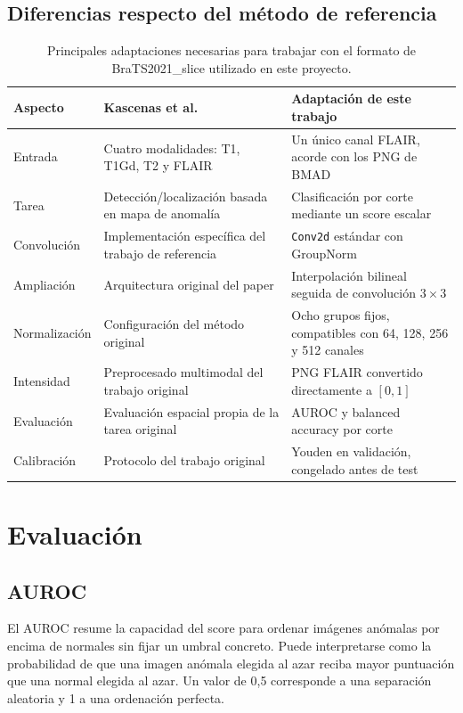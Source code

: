 \documentclass[10pt,a4paper,twocolumn]{article}
\begin{document}
\subsection{Diferencias respecto del método de referencia}
\begin{table}[t]
\centering
\small
\begin{tabularx}{0.98\textwidth}{p{3.0cm}XX}
\toprule
Aspecto & Kascenas et al. & Adaptación de este trabajo \\
\midrule
Entrada & Cuatro modalidades: T1, T1Gd, T2 y FLAIR & Un único canal FLAIR, acorde con los PNG de BMAD \\
Tarea & Detección/localización basada en mapa de anomalía & Clasificación por corte mediante un score escalar \\
Convolución & Implementación específica del trabajo de referencia & \texttt{Conv2d} estándar con GroupNorm \\
Ampliación & Arquitectura original del paper & Interpolación bilineal seguida de convolución $3\times3$ \\
Normalización & Configuración del método original & Ocho grupos fijos, compatibles con 64, 128, 256 y 512 canales \\
Intensidad & Preprocesado multimodal del trabajo original & PNG FLAIR convertido directamente a $[0,1]$ \\
Evaluación & Evaluación espacial propia de la tarea original & AUROC y balanced accuracy por corte \\
Calibración & Protocolo del trabajo original & Youden en validación, congelado antes de test \\
\bottomrule
\end{tabularx}
\caption{Principales adaptaciones necesarias para trabajar con el formato de
BraTS2021\_slice utilizado en este proyecto.}
\label{tab:differences}
\end{table}

\section{Evaluación}

\subsection{AUROC}
El AUROC resume la capacidad del score para ordenar imágenes anómalas por encima
de normales sin fijar un umbral concreto. Puede interpretarse como la
probabilidad de que una imagen anómala elegida al azar reciba mayor puntuación
que una normal elegida al azar. Un valor de 0,5 corresponde a una separación
aleatoria y 1 a una ordenación perfecta.
\end{document}
